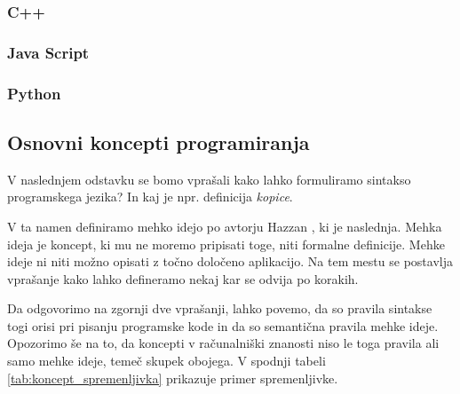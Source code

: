 \subsubsection{C++}
\label{sec:pj_c++}

\subsubsection{Java Script}
\label{sec:pj_JS}

\subsubsection{Python}
\label{sec:pj_python}


\subsection{Osnovni koncepti programiranja}
\label{sec:Osnvni koncepti_programiranja}

V naslednjem odstavku se bomo vprašali kako lahko formuliramo sintakso
programskega jezika? In kaj je npr. definicija \emph{kopice}.

V ta namen definiramo mehko idejo po avtorju Hazzan \cite{guideTCS},
ki je naslednja. Mehka ideja je koncept, ki mu ne moremo pripisati
toge, niti formalne definicije. Mehke ideje ni niti možno opisati z
točno določeno aplikacijo. Na tem mestu se postavlja vprašanje kako
lahko defineramo nekaj kar se odvija po korakih.

Da odgovorimo na zgornji dve vprašanji, lahko povemo, da so pravila
sintakse togi orisi pri pisanju programske kode in da so semantična
pravila mehke ideje. Opozorimo še na to, da koncepti v računalniški
znanosti niso le toga pravila ali samo mehke ideje, temeč skupek
obojega. V spodnji tabeli \ref{tab:koncept_spremenljivka} prikazuje
primer spremenljivke.


